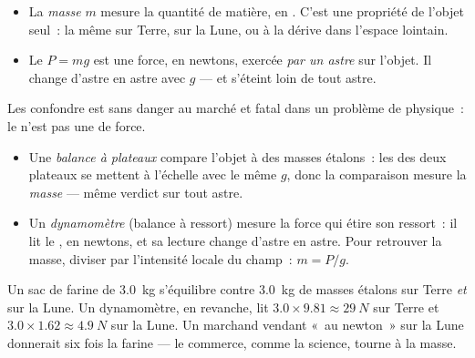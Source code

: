 \begin{remark}\label{rem:g10:universal-gravitation:massweight}
\begin{itemize}
  \item La \emph{masse} $m$ mesure la quantité de matière, en
        . C'est une propriété de l'objet seul~: la
        même sur Terre, sur la Lune, ou à la dérive dans l'espace
        lointain.
  \item Le \emph{} $P = mg$ est une force, en newtons,
        exercée \emph{par un astre} sur l'objet. Il change d'astre en
        astre avec $g$ --- et s'éteint loin de tout astre.
\end{itemize}
Les confondre est sans danger au marché et fatal dans un problème de
physique~: le  n'est pas une  de force.
\end{remark}

\begin{method}\label{met:g10:universal-gravitation:instruments}
\begin{itemize}
  \item Une \emph{balance à plateaux} compare l'objet à des masses
        étalons~: les  des deux plateaux se mettent à
        l'échelle avec le même $g$, donc la comparaison mesure la
        \emph{masse} --- même verdict sur tout astre.
  \item Un \emph{dynamomètre} (balance à ressort) mesure la force qui
        étire son ressort~: il lit le \emph{}, en newtons, et
        sa lecture change d'astre en astre. Pour retrouver la masse,
        diviser par l'intensité locale du champ~: $m = P/g$.
\end{itemize}
\end{method}

\begin{example}\label{ex:g10:universal-gravitation:flour}
Un sac de farine de \qty{3.0}{kg} s'équilibre contre \qty{3.0}{kg} de
masses étalons sur Terre \emph{et} sur la Lune. Un dynamomètre, en
revanche, lit $3.0 \times 9.81 \approx \qty{29}{N}$ sur Terre et
$3.0 \times 1.62 \approx \qty{4.9}{N}$ sur la Lune. Un marchand
vendant «~au newton~» sur la Lune donnerait six fois la farine --- le
commerce, comme la science, tourne à la masse.
\end{example}

